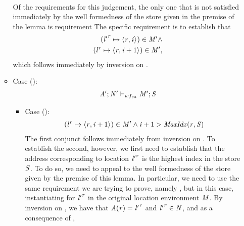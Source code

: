 \begin{nproof}
\begin{bcase}
\begin{itemize}
\begin{itemize}
\begin{align*}
      \end{align*}
      Of the requirements for this judgement, the only one that is
      not satisfied immediately by the well formedness of the store
      given in the premise of the lemma is requirement
      The specific requirement is to establish that
      \begin{align*}
      ({\mathit{l}'}^{\mathit{r}} \mapsto \langle \mathit{r}, \mathit{i} \rangle ^{})  \in \mathit{M}' \wedge \\
      ({\mathit{l}}^{\mathit{r}} \mapsto \langle \mathit{r}, \mathit{i} + 1 \rangle ^{})  \in \mathit{M}',
      \end{align*}
      which follows immediately by inversion on \dletloctag{}.
      \item Case ():
      \begin{align*}
      \mathit{A}';\mathit{N}' \vdash_{wf_{ca}} \mathit{M}';\mathit{S}
      \end{align*}
        \begin{itemize}
        \item Case ():
        \begin{align*}
                  ({\mathit{l}}^{\mathit{r}} \mapsto \langle \mathit{r}, \mathit{i}+1 \rangle ^{}) \in \mathit{M}' \wedge
          \mathit{i}+1 > \mathit{MaxIdx}(\mathit{r},\mathit{S})
        \end{align*}
        The first conjunct follows immediately from inversion on \dletloctag{}.
        To establish the second, however, we first need to establish
        that the address corresponding to location ${\mathit{l}'}^{\mathit{r}}$ is the highest index in
        the store $\mathit{S}$.
        To do so, we need to appeal to the well formedness of the store given by the
        premise of this lemma.
        In particular, we need to use the same requirement we are trying to prove,
        namely , but in this case,
        instantiating for ${\mathit{l}'}^{\mathit{r}}$ in the original location environment $\mathit{M}$.
        By inversion on \tlltag{}, we have that $\mathit{A}(\mathit{r}) = {\mathit{l}'}^{\mathit{r}}$ and ${\mathit{l}'}^{\mathit{r}} \in \mathit{N}$,
        and as a consequence of ,
        \begin{align*}

\end{align*}
\end{itemize}
\end{itemize}
\end{itemize}
\end{bcase}
\end{nproof}

